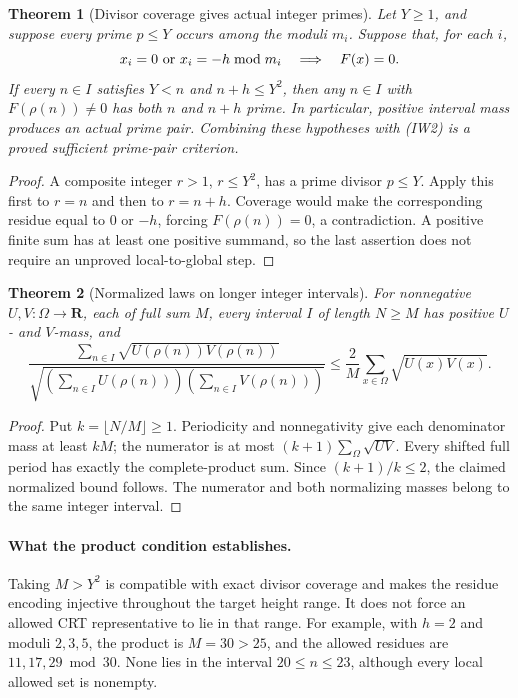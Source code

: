 \documentclass[11pt]{article}
\newtheorem{theorem}{Theorem}[section]
\begin{document}
\begin{theorem}[Divisor coverage gives actual integer primes]
\label{thm:integer-coverage-certificate}
Let \(Y\ge1\), and suppose every prime \(p\le Y\) occurs among the
moduli \(m_i\). Suppose that, for each \(i\),
\[
 x_i=0\ \hbox{or}\ x_i=-h\bmod m_i
                \quad\Longrightarrow\quad F(x)=0.
\]
If every \(n\in I\) satisfies \(Y<n\) and \(n+h\le Y^2\), then any
\(n\in I\) with \(F(\rho(n))\ne0\) has both \(n\) and \(n+h\) prime.
In particular, positive interval mass produces an actual prime pair.
Combining these hypotheses with (IW2) is a proved sufficient
prime-pair criterion.
\end{theorem}
\begin{proof}
A composite integer \(r>1\), \(r\le Y^2\), has a prime divisor
\(p\le Y\). Apply this first to \(r=n\) and then to \(r=n+h\).
Coverage would make the corresponding residue equal to \(0\) or
\(-h\), forcing \(F(\rho(n))=0\), a contradiction.
A positive finite sum has at least one positive summand, so the
last assertion does not require an unproved local-to-global step.
\end{proof}

\begin{theorem}[Normalized laws on longer integer intervals]
For nonnegative \(U,V:\Omega\to\mathbf R\), each of full sum \(M\),
every interval \(I\) of length \(N\ge M\) has positive \(U\)- and
\(V\)-mass, and
\[
 \frac{\sum_{n\in I}\sqrt{U(\rho(n))V(\rho(n))}}
 {\sqrt{\left(\sum_{n\in I}U(\rho(n))\right)
              \left(\sum_{n\in I}V(\rho(n))\right)}}
 \le \frac2M\sum_{x\in\Omega}\sqrt{U(x)V(x)}.
 \tag{IW4}
\]
\end{theorem}
\begin{proof}
Put \(k=\lfloor N/M\rfloor\ge1\). Periodicity and nonnegativity
give each denominator mass at least \(kM\); the numerator is at
most \((k+1)\sum_{\Omega}\sqrt{UV}\). Every shifted full period
has exactly the complete-product sum. Since \((k+1)/k\le2\),
the claimed normalized bound follows. The numerator and both
normalizing masses belong to the same integer interval.
\end{proof}

\paragraph{What the product condition establishes.}
Taking \(M>Y^2\) is compatible with exact divisor coverage and makes
the residue encoding injective throughout the target height range.
It does not force an allowed CRT representative to lie in that range.
For example, with \(h=2\) and moduli \(2,3,5\), the product is
\(M=30>25\), and the allowed residues are \(11,17,29\bmod30\).
None lies in the interval \(20\le n\le23\), although every local
allowed set is nonempty.
\end{document}
